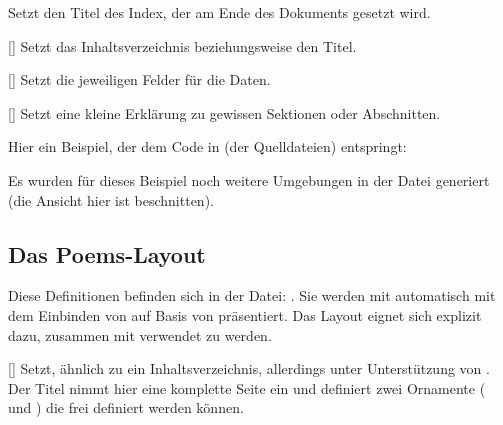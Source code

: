 Setzt den Titel des Index, der am Ende des Dokuments gesetzt wird.

%
%
%

[\cmdlist{}]
Setzt das Inhaltsverzeichnis beziehungsweise den Titel.

%
%
%

[\cmdlist{}\cmdlist{}]
Setzt die jeweiligen Felder für die Daten.

%
%
%

[]
Setzt eine kleine Erklärung zu gewissen Sektionen oder Abschnitten.

%
%
%
%
%

Hier ein Beispiel, der dem Code in  (der Quelldateien) entspringt:
\begin{tcbraster}[raster columns=2, blankest,colback=white,graphics options={trim=0cm 6.5cm 0cm 0cm,clip}]
\end{tcbraster}
Es wurden für dieses Beispiel noch weitere Umgebungen in der Datei generiert (die Ansicht hier ist beschnitten).

%
%
%
%
%

\subsection{Das Poems-Layout}
Diese Definitionen befinden sich in der Datei: . Sie werden mit  automatisch mit dem Einbinden von  auf Basis von  präsentiert. Das Layout eignet sich explizit dazu, zusammen mit  verwendet zu werden.

%
%
%

[\cmdlist{}\secline{}]
Setzt, ähnlich zu  ein Inhaltsverzeichnis, allerdings unter Unterstützung von . Der Titel nimmt hier eine komplette Seite ein und definiert zwei Ornamente ( und ) die frei definiert werden können.

